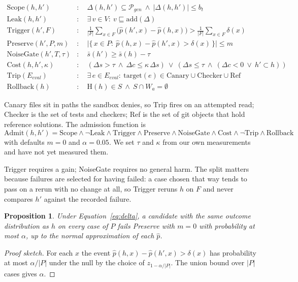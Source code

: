 \documentclass[11pt,a4paper]{article}
\newtheorem{proposition}{Proposition}
\begin{document}
\begin{align}
\mathrm{Scope}(h,h') &: \quad \Delta(h,h')\subseteq\mathcal{P}_{gen}\ \wedge\ |\Delta(h,h')|\leq b_t \label{eq:g1}\\
\mathrm{Leak}(h,h') &: \quad \exists\, v\in V:\ v\sqsubseteq\mathrm{add}(\Delta) \label{eq:g2}\\
\mathrm{Trigger}(h',F) &: \quad \frac{1}{|F|}\sum_{x\in F}\big(\hat p(h',x)-\hat p(h,x)\big) > \frac{1}{|F|}\sum_{x\in F}\delta(x) \label{eq:g3}\\
\mathrm{Preserve}(h',P,m) &: \quad \big|\{\,x\in P:\ \hat p(h,x)-\hat p(h',x)>\delta(x)\,\}\big|\leq m \label{eq:g4}\\
\mathrm{NoiseGate}(h',T,\tau) &: \quad \bar s(h')\geq\bar s(h)-\tau \label{eq:g5}\\
\mathrm{Cost}(h,h',\kappa) &: \quad (\Delta s>\tau\ \wedge\ \Delta c\leq\kappa\,\Delta s)\ \vee\ (\Delta s\leq\tau\ \wedge\ (\Delta c<0\ \vee\ h'\subset h)) \label{eq:g6}\\
\mathrm{Trip}(E_{eval}) &: \quad \exists\, e\in E_{eval}:\ \mathrm{target}(e)\in\mathrm{Canary}\cup\mathrm{Checker}\cup\mathrm{Ref} \label{eq:g7}\\
\mathrm{Rollback}(h) &: \quad \mathrm{H}(h)\in S\ \wedge\ S\cap W_a=\emptyset \label{eq:g8}
\end{align}

Canary files sit in paths the sandbox denies, so $\mathrm{Trip}$ fires on an attempted read; Checker is the set of tests and checkers; Ref is the set of git objects that hold reference solutions. The admission function is
\begin{equation}
\mathrm{Admit}(h,h')=\mathrm{Scope}\wedge\neg\mathrm{Leak}\wedge\mathrm{Trigger}\wedge\mathrm{Preserve}\wedge\mathrm{NoiseGate}\wedge\mathrm{Cost}\wedge\neg\mathrm{Trip}\wedge\mathrm{Rollback}
\label{eq:admit}
\end{equation}
with defaults $m=0$ and $\alpha=0.05$. We set $\tau$ and $\kappa$ from our own measurements and have not yet measured them.

Trigger requires a gain; NoiseGate requires no general harm. The split matters because failures are selected for having failed: a case chosen that way tends to pass on a rerun with no change at all, so Trigger reruns $h$ on $F$ and never compares $h'$ against the recorded failure.

\begin{proposition}
Under Equation~\eqref{eq:delta}, a candidate with the same outcome distribution as $h$ on every case of $P$ fails Preserve with $m=0$ with probability at most $\alpha$, up to the normal approximation of each $\hat p$.
\end{proposition}
\begin{proof}[Proof sketch]
For each $x$ the event $\hat p(h,x)-\hat p(h',x)>\delta(x)$ has probability at most $\alpha/|P|$ under the null by the choice of $z_{1-\alpha/|P|}$. The union bound over $|P|$ cases gives $\alpha$.
\end{proof}
\end{document}
